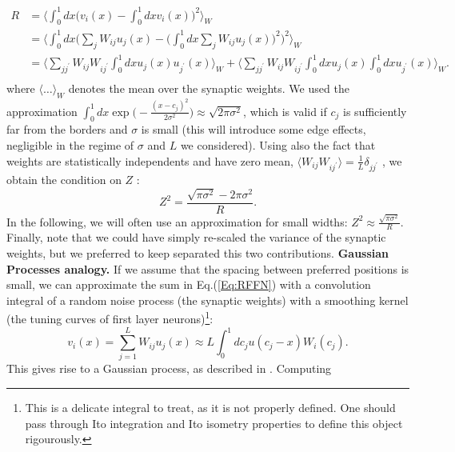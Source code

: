 \documentclass[a4paper]{article}%
\begin{document}
\begin{equation}%
\begin{split}
R & = \Big\langle \int_{0}^{1} dx \Big(v_{i}(x) - \int_{0}^{1} dx v_{i}(x)
\Big)^{2} \Big\rangle_{W}\\
& =\Big \langle \int_{0}^{1} dx \Big(\sum_{j} W_{ij} u_{j}(x) - \big(\int%
_{0}^{1} dx \sum_{j} W_{ij} u_{j}(x) \big)^{2} \Big)^{2} \Big\rangle_{W}\\
& = \Big\langle \sum_{jj^{\prime}} W_{ij} W_{ij^{\prime}}\int_{0}^{1} dx
u_{j}(x)u_{j^{\prime}}(x)\Big\rangle_{W} +\Big\langle \sum_{jj^{\prime}}%
W_{ij}W_{ij^{\prime}}\int_{0}^{1} dx u_{j}(x) \int_{0}^{1} dx u_{j^{\prime}%
}(x)\Big \rangle_{W}.\\
\end{split}
\end{equation}
where $\langle\dots\rangle_{W}$ denotes the mean over the synaptic weights. We
used the approximation $\int_{0}^{1} dx \exp\Big(-\frac{(x-c_{j})^{2}}{2
\sigma^{2}}\Big) \approx\sqrt{2\pi\sigma^{2}}$, which is valid if $c_{j}$ is
sufficiently far from the borders and $\sigma$ is small (this will introduce
some edge effects, negligible in the regime of $\sigma$ and $L$ we
considered). Using also the fact that weights are statistically independents
and have zero mean, $\langle W_{ij}W_{ij^{\prime}} \rangle= \frac{1}{L}%
\delta_{jj^{\prime}}$ , we obtain the condition on $Z$ :
\begin{equation}
Z^{2} = \frac{\sqrt{\pi\sigma^{2}} - 2\pi\sigma^{2}}{R}.
\end{equation}
In the following, we will often use an approximation for small widths: $Z^{2}
\approx\frac{\sqrt{\pi\sigma^{2}}}{R}$. Finally, note that we could have
simply re-scaled the variance of the synaptic weights, but we preferred to
keep separated this two contributions. \newline\newline\textbf{Gaussian
Processes analogy.} If we assume that the spacing between preferred positions
is small, we can approximate the sum in Eq.(\ref{Eq:RFFN}) with a convolution
integral of a random noise process (the synaptic weights) with a smoothing
kernel (the tuning curves of first layer neurons)\footnote{This is a delicate
integral to treat, as it is not properly defined. One should pass through Ito
integration and Ito isometry properties to define this object rigourously.}:
\[
v_{i}(x) =\sum_{j=1}^{L} W_{ij}u_{j}(x) \approx L \int_{0}^{1} dc_{j}
u(c_{j}-x) W_{i}(c_{j}).
\]
This gives rise to a Gaussian process, as described in
\cite{Higdon2002SpaceConvolutionsb,Rasmussen2004GaussianLearning}. Computing
\end{document}
